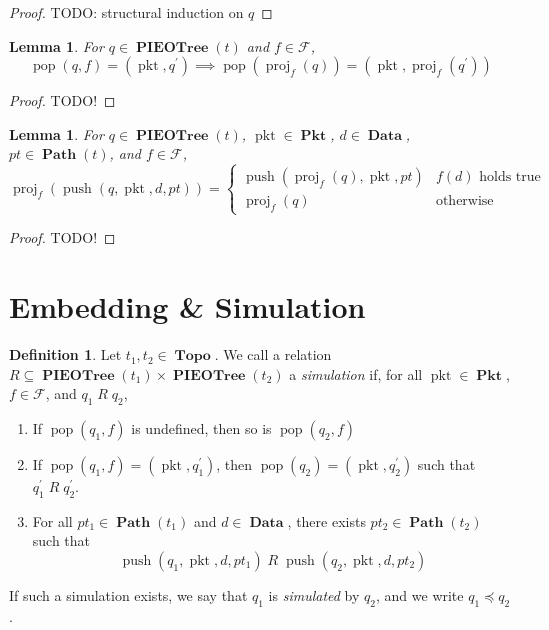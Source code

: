 \documentclass{amsart}
\DeclareMathOperator{\pkt}{\mathrm{pkt}}
\DeclareMathOperator{\push}{\mathrm{push}}
\DeclareMathOperator{\pop}{\mathrm{pop}}
\DeclareMathOperator{\proj}{\mathrm{proj}}
\DeclareMathOperator{\Pkt}{\mathbf{Pkt}}
\DeclareMathOperator{\Data}{\mathbf{Data}}
\DeclareMathOperator{\Topo}{\mathbf{Topo}}
\DeclareMathOperator{\Path}{\mathbf{Path}}
\DeclareMathOperator{\PIEOTree}{\mathbf{PIEOTree}}
\newtheorem{lem}[thm]{Lemma}
\theoremstyle{definition}
\newtheorem{dfn}[thm]{Definition}
\begin{document}
\begin{proof}
    TODO: structural induction on $q$
\end{proof}

\begin{lem}
    For $q \in \PIEOTree(t)$ and $f \in \mathcal F$, 
    $$
        \pop(q, f) = (\pkt, q^\prime) \implies \pop(\proj_f(q)) = (\pkt, \proj_f(q^\prime))
    $$
\end{lem}

\begin{proof}
    TODO!
\end{proof}

\begin{lem}
    For $q \in \PIEOTree(t)$, $\pkt \in \Pkt$, $d \in \Data$, $pt \in \Path(t)$, and $f \in \mathcal F$,
    $$
        \proj_f(\push(q, \pkt, d, pt)) = 
        \begin{cases}
            \push(\proj_f(q), \pkt, pt) & f(d) \text{ holds true}\\
            \proj_f(q) & \text{otherwise}
        \end{cases}
    $$
\end{lem}

\begin{proof}
    TODO!
\end{proof}


\section{Embedding \& Simulation}

\begin{dfn}
    Let $t_1, t_2 \in \Topo$. 
    We call a relation $R \subseteq \PIEOTree(t_1) \times \PIEOTree(t_2)$ a \emph{simulation} if, 
    for all $\pkt \in \Pkt$, $f \in \mathcal F$, and $q_1 \; R \; q_2$,
    \begin{enumerate}
        \item If $\pop(q_1, f)$ is undefined, then so is $\pop(q_2, f)$
        \item If $\pop(q_1, f) = (\pkt, q_1^\prime)$, then $\pop(q_2) = (\pkt, q_2^\prime)$ such that $q_1^\prime \; R \; q_2^\prime$.
        \item For all $pt_1 \in \Path(t_1)$ and $d \in \Data$, there exists $pt_2 \in \Path(t_2)$ such that
            $$\push(q_1, \pkt, d, pt_1) \; R \; \push(q_2, \pkt, d, pt_2)$$
    \end{enumerate}
    If such a simulation exists, we say that $q_1$ is \emph{simulated} by $q_2$, and we write $q_1 \preccurlyeq q_2$.
\end{dfn}
\end{document}
